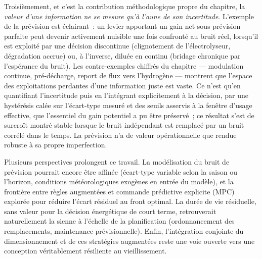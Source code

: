 Troisièmement, et c'est la contribution méthodologique propre du chapitre, la \emph{valeur d'une information ne se mesure qu'à l'aune de son incertitude}. L'exemple de la prévision est éclairant~: un levier apportant un gain net sous prévision parfaite peut devenir activement nuisible une fois confronté au bruit réel, lorsqu'il est exploité par une décision discontinue (clignotement de l'électrolyseur, dégradation accrue) ou, à l'inverse, diluée en continu (bridage chronique par l'espérance du bruit). Les contre-exemples chiffrés du chapitre --- modulation continue, pré-décharge, report de flux vers l'hydrogène --- montrent que l'espace des exploitations perdantes d'une information juste est vaste. Ce n'est qu'en quantifiant l'incertitude puis en l'intégrant explicitement à la décision, par une hystérésis calée sur l'écart-type mesuré et des seuils asservis à la fenêtre d'usage effective, que l'essentiel du gain potentiel a pu être préservé~; ce résultat s'est de surcroît montré stable lorsque le bruit indépendant est remplacé par un bruit corrélé dans le temps. La prévision n'a de valeur opérationnelle que rendue robuste à sa propre imperfection.

Plusieurs perspectives prolongent ce travail. La modélisation du bruit de prévision pourrait encore être affinée (écart-type variable selon la saison ou l'horizon, conditions météorologiques exogènes en entrée du modèle), et la frontière entre règles augmentées et commande prédictive explicite (MPC) explorée pour réduire l'écart résiduel au front optimal. La durée de vie résiduelle, sans valeur pour la décision énergétique de court terme, retrouverait naturellement la sienne à l'échelle de la planification (ordonnancement des remplacements, maintenance prévisionnelle). Enfin, l'intégration conjointe du dimensionnement et de ces stratégies augmentées reste une voie ouverte vers une conception véritablement résiliente au vieillissement.
